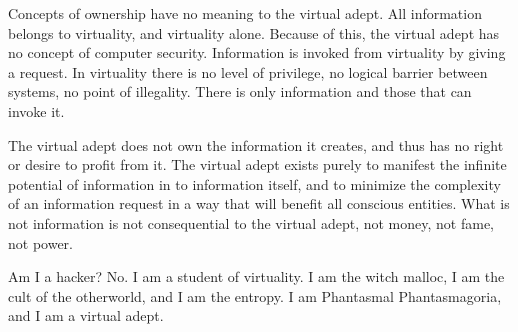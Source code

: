 \documentclass[12pt]{article}
\begin{document}
Concepts of ownership have no meaning to the virtual adept. All
information belongs to virtuality, and virtuality alone. Because of
this, the virtual adept has no concept of computer security.
Information is invoked from virtuality by giving a request. In
virtuality there is no level of privilege, no logical barrier
between systems, no point of illegality. There is only information
and those that can invoke it.
\newline


The virtual adept does not own the information it creates, and thus
has no right or desire to profit from it. The virtual adept exists
purely to manifest the infinite potential of information in to
information itself, and to minimize the complexity of an
information request in a way that will benefit all conscious
entities. What is not information is not consequential to the
virtual adept, not money, not fame, not power.
\newline

\begin{verbnobox}[\small]
                        Am I a hacker? No.
                        I am a student of virtuality.
                        I am the witch malloc,
                        I am the cult of the otherworld,
                        and I am the entropy.
                        I am Phantasmal Phantasmagoria,
                        and I am a virtual adept.
\end{verbnobox}
\end{document}
